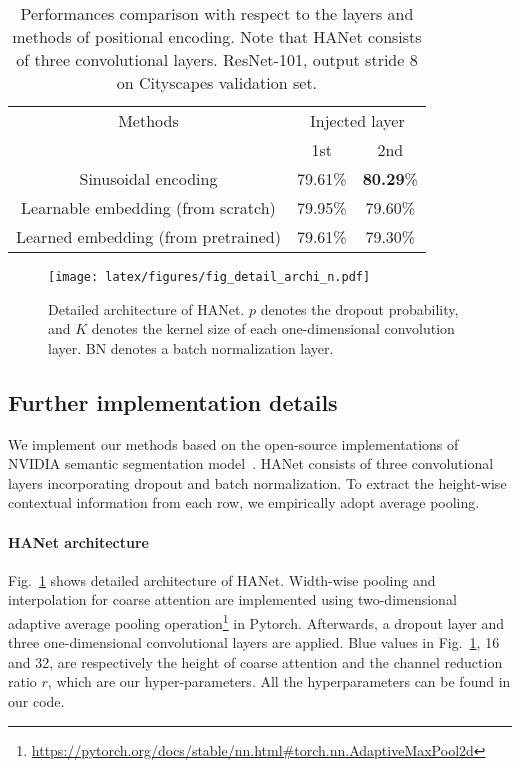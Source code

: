 \documentclass[10pt,twocolumn,letterpaper]{article}
\newcommand{\drule}{\specialrule{0.2pt}{1pt}{1pt}\specialrule{0.2pt}{0pt}{\belowrulesep}}
\begin{document}
\begin{table}[!h]
\vspace{-0.1cm}
\begin{center}
\footnotesize
\begin{tabular}{c|cc}
\toprule
\multirow{2.5}{*}{Methods} & \multicolumn{2}{c}{Injected layer}  \\\cmidrule{2-3}
& 1st & 2nd \\
\drule
Sinusoidal encoding & 79.61\% & \textbf{80.29}\% \\
\midrule
Learnable embedding (from scratch) & 79.95\% & 79.60\%  \\
\midrule
Learned embedding (from pretrained) & 79.61\% & 79.30\%  \\
\bottomrule
\end{tabular}
\end{center}
\vspace*{-0.5cm}
\caption{Performances comparison with respect to the layers and methods of positional encoding. Note that HANet consists of three convolutional layers. ResNet-101, output stride 8 on Cityscapes validation set.}
\label{tab_poisitional}
\vspace*{-0.4cm}
\end{table}

\begin{figure}[!t]
\centering
  \texttt{[image: latex/figures/fig\_detail\_archi\_n.pdf]}
  \vspace*{-0.1cm}
  \caption{Detailed architecture of HANet. $p$ denotes the dropout probability, and $K$ denotes the kernel size of each one-dimensional convolution layer. BN denotes a batch normalization layer.}
\label{fig:hanet_arch}
\vspace*{-0.5cm}
\end{figure}

\subsection{Further implementation details} \label{app:further_details}
\vspace*{-0.1cm}
We implement our methods based on the open-source implementations of NVIDIA semantic segmentation model~\cite{zhu2019improving}.
HANet consists of three convolutional layers incorporating dropout and batch normalization. To extract the height-wise contextual information from each row, we empirically adopt average pooling.
\vspace*{-0.3cm}
\paragraph{HANet architecture}
Fig.~\ref{fig:hanet_arch} shows detailed architecture of HANet. Width-wise pooling and interpolation for coarse attention are implemented using two-dimensional adaptive average pooling operation\footnote{\url{https://pytorch.org/docs/stable/nn.html\#torch.nn.AdaptiveMaxPool2d}} in Pytorch. 
Afterwards, a dropout layer and three one-dimensional convolutional layers are applied. Blue values in Fig.~\ref{fig:hanet_arch}, 16 and 32, are respectively the height of coarse attention and the channel reduction ratio $r$, which are our hyper-parameters. All the hyperparameters can be found in our code.
\end{document}
